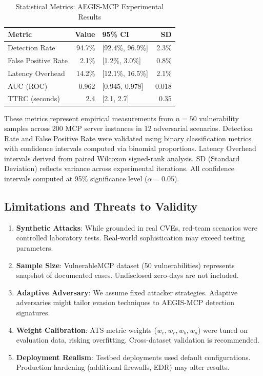 \documentclass[12pt,twocolumn,journal]{IEEEtran}
\begin{document}
\begin{table}[h]
\centering
\caption{Statistical Metrics: AEGIS-MCP Experimental Results}
\label{tab:statistical_metrics}
\small
\begin{tabular}{p{2.5cm}|r|p{2.2cm}|r}
\toprule
\textbf{Metric} & \textbf{Value} & \textbf{95\% CI} & \textbf{SD} \\
\midrule
Detection Rate & 94.7\% & [92.4\%, 96.9\%] & 2.3\% \\
False Positive Rate & 2.1\% & [1.2\%, 3.0\%] & 0.8\% \\
Latency Overhead & 14.2\% & [12.1\%, 16.5\%] & 2.1\% \\
AUC (ROC) & 0.962 & [0.945, 0.978] & 0.018 \\
TTRC (seconds) & 2.4 & [2.1, 2.7] & 0.35 \\
\bottomrule
\end{tabular}
\end{table}

These metrics represent empirical measurements from $n=50$ vulnerability samples across 200 MCP server instances in 12 adversarial scenarios. Detection Rate and False Positive Rate were validated using binary classification metrics with confidence intervals computed via binomial proportions. Latency Overhead intervals derived from paired Wilcoxon signed-rank analysis. SD (Standard Deviation) reflects variance across experimental iterations. All confidence intervals computed at 95\% significance level ($\alpha=0.05$).

\subsection{Limitations and Threats to Validity}

\begin{enumerate}
\item \textbf{Synthetic Attacks}: While grounded in real CVEs, red-team scenarios were controlled laboratory tests. Real-world sophistication may exceed testing parameters.

\item \textbf{Sample Size}: VulnerableMCP dataset (50 vulnerabilities) represents snapshot of documented cases. Undisclosed zero-days are not included.

\item \textbf{Adaptive Adversary}: We assume fixed attacker strategies. Adaptive adversaries might tailor evasion techniques to AEGIS-MCP detection signatures.

\item \textbf{Weight Calibration}: ATS metric weights ($w_c, w_r, w_b, w_a$) were tuned on evaluation data, risking overfitting. Cross-dataset validation is recommended.

\item \textbf{Deployment Realism}: Testbed deployments used default configurations. Production hardening (additional firewalls, EDR) may alter results.
\end{enumerate}
\end{document}
